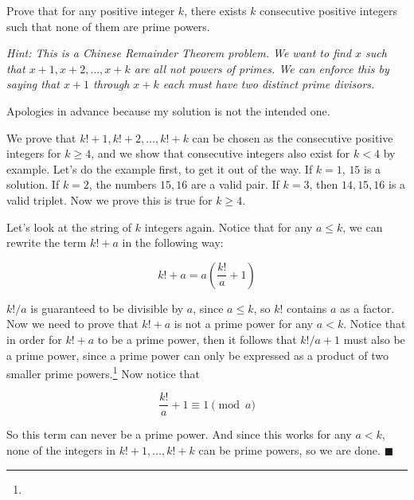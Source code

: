 \documentclass[11pt]{article}
\begin{document}
Prove that for any positive integer $k$, there exists $k$ consecutive positive integers
such that none of them are prime powers.

\emph{Hint: This is a Chinese Remainder Theorem problem. We want to find $x$ such that $x + 1, x + 2, \ldots, x+k$ are all not powers of primes. We can enforce this by saying that $x+1$ through $x+k$ each must have two distinct prime divisors.}


\begin{solution}
  Apologies in advance because my solution is not the intended one. 
  
  We prove that $k! + 1, k! + 2, \dots, k! + k$ can be chosen as the consecutive positive integers for $k \ge 4$, and we show that consecutive integers also exist for $k < 4$ by example. Let's do the example first, to get it out of the way. If $k = 1$, $15$ is a solution. If $k = 2$, the numbers $15, 16$ are a valid pair. If $k = 3$, then $14, 15, 16$ is a valid triplet. Now we prove this is true for $k \ge 4$. 

  Let's look at the string of $k$ integers again. Notice that for any $a \le k$, we can rewrite the term $k! + a$ in the following way:

  \[k! + a = a\left(\frac{k!}{a} + 1\right)\]

  $k!/a$ is guaranteed to be divisible by $a$, since $a \le k$, so $k!$ contains $a$ as a factor. Now we need to prove that $k! + a$ is not a prime power for any $a < k$. Notice that in order for $k! + a$ to be a prime power, then it follows that $k!/a + 1$ must also be a prime power, since a prime power can only be expressed as a product of two smaller prime powers.\footnote{{\color{blue}{We can prove this is true by noticing that for any $b$ given prime $a$: \[ a^n b = a^m \implies b = \frac{a^m}{a^n} = a^{m-n}\] which is clearly a prime power.}}} Now notice that 
  
  \[\frac{k!}{a} + 1 \equiv 1 \pmod {a}\]

  So this term can never be a prime power. And since this works for any $a < k$, none of the integers in $k! + 1, \dots, k! +k$ can be prime powers, so we are done. $\blacksquare$
\end{solution}
\end{document}
